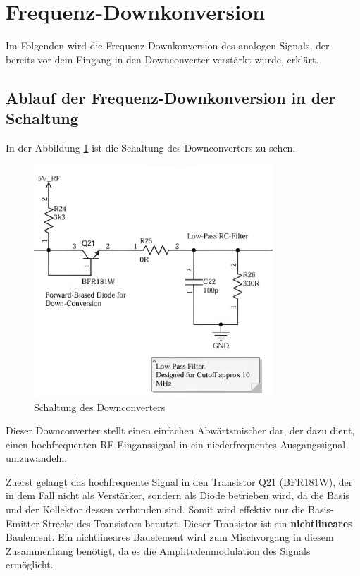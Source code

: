 \section{Frequenz-Downkonversion} %
Im Folgenden wird die Frequenz-Downkonversion des analogen Signals, der bereits vor dem Eingang in den Downconverter verstärkt wurde, erklärt.
\subsection{Ablauf der Frequenz-Downkonversion in der Schaltung}
In der Abbildung \ref{fig:downconverter} ist die Schaltung des Downconverters zu sehen.
\begin{figure}[H]
    \centering
    \includegraphics[width=0.8\textwidth]{Pictures/Downconverter.png}
    \caption{Schaltung des Downconverters}
    \label{fig:downconverter}
\end{figure}
Dieser Downconverter stellt einen einfachen Abwärtsmischer dar, der dazu dient, einen hochfrequenten \ac{RF}-Einganssignal in ein niederfrequentes Ausgangssignal umzuwandeln. 

Zuerst gelangt das hochfrequente Signal in den Transistor Q21 (BFR181W), der in dem Fall nicht als Verstärker, sondern als Diode betrieben wird, da die Basis und der Kollektor dessen verbunden sind. Somit wird effektiv nur die Basis-Emitter-Strecke des Transistors benutzt. Dieser Transistor ist ein \textbf{nichtlineares} Baulement.
Ein nichtlineares Bauelement wird zum Mischvorgang in diesem Zusammenhang benötigt, da es die Amplitudenmodulation des Signals ermöglicht. 

